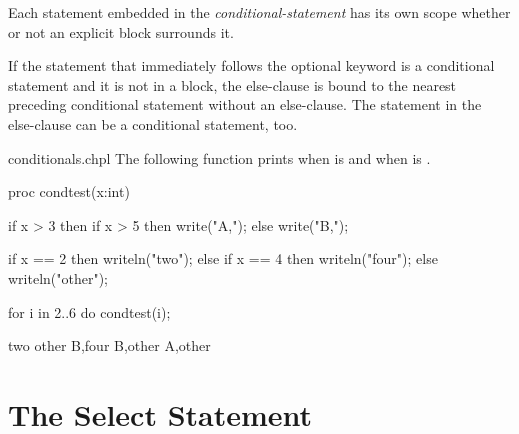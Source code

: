 Each statement embedded in the {\em conditional-statement} has its own
scope whether or not an explicit block surrounds it.

If the statement that immediately follows the optional 
keyword is a conditional statement and it is not in a block, the
else-clause is bound to the nearest preceding conditional statement
without an else-clause.
The statement in the else-clause can be a conditional statement, too.

\begin{chapelexample}{conditionals.chpl}
The following function prints  when  is 
and  when  is .
\begin{chapel}
proc condtest(x:int) {
  if x > 3 then
    if x > 5 then
      write("A,");
    else
      write("B,");

  if x == 2 then
    writeln("two");
  else if x == 4 then
    writeln("four");
  else
    writeln("other");
}
\end{chapel}
\begin{chapelpost}
for i in 2..6 do condtest(i);
\end{chapelpost}
\begin{chapeloutput}
two
other
B,four
B,other
A,other
\end{chapeloutput}
\end{chapelexample}

\pagebreak
\section{The Select Statement}
\label{The_Select_Statement}

